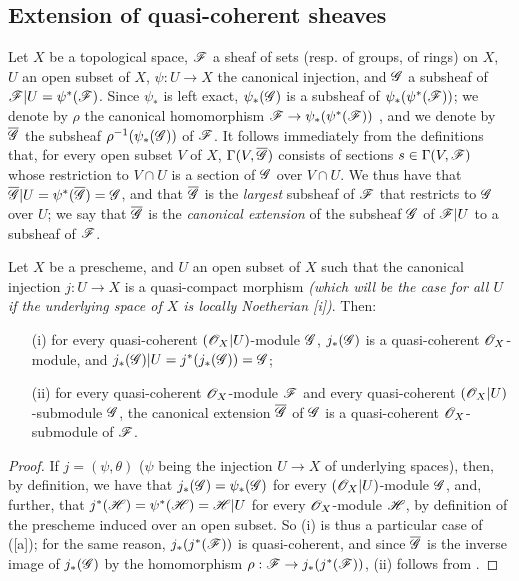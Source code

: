 \subsection{Extension of quasi-coherent sheaves}
\label{subsection:I.9.4}

\begin{env}[9.4.1]
\label{I.9.4.1}
Let
$X$ be a topological space, $\mathscr{F}$ a sheaf of sets (resp. of groups, of rings) on $X$, $U$
an open subset of $X$, $\psi:U\to X$ the canonical injection, and $\mathscr{G}$ a subsheaf of
$\mathscr{F}|U=\psi^*(\mathscr{F})$. Since $\psi_*$ is left exact, $\psi_*(\mathscr{G})$ is a subsheaf of
$\psi_*(\psi^*(\mathscr{F}))$; we denote by $\rho$ the canonical homomorphism
$\sh{F}\to\psi_*(\psi^*(\sh{F}))$ , and we denote by $\overline{\mathscr{G}}$
the subsheaf $\rho^{-1}(\psi_*(\mathscr{G}))$ of $\mathscr{F}$. It follows immediately from the
definitions that, for every open subset $V$ of $X$, $\Gamma(V,\overline{\mathscr{G}})$ consists of
sections $s\in\Gamma(V,\mathscr{F})$ whose restriction to $V\cap U$ is a section of $\mathscr{G}$ over
$V\cap U$. We thus have that $\overline{\mathscr{G}}|U=\psi^*(\overline{\mathscr{G}})=\mathscr{G}$, and that
$\overline{\mathscr{G}}$ is the \emph{largest} subsheaf of $\mathscr{F}$ that restricts to $\mathscr{G}$
over $U$; we say that $\overline{\mathscr{G}}$ is the \emph{canonical extension} of the subsheaf
$\mathscr{G}$ of $\mathscr{F}|U$ to a subsheaf of $\mathscr{F}$.
\end{env}

\begin{proposition}[9.4.2]
\label{I.9.4.2}
Let $X$ be a prescheme, and $U$ an open subset of $X$ such that the canonical injection
$j:U\to X$ is a quasi-compact morphism \emph{(which will be the case for \emph{all} $U$ if
the underlying space of $X$ is \emph{locally Noetherian}
[i])}. Then:
\begin{enumerate}
  \item[{\rm(i)}] for every quasi-coherent $(\mathscr{O}_X|U)$-module $\mathscr{G}$, $j_*(\mathscr{G})$
    is a quasi-coherent $\mathscr{O}_X$-module, and $j_*(\mathscr{G})|U=j^*(j_*(\mathscr{G}))=\mathscr{G}$;
  \item[{\rm(ii)}] for every quasi-coherent $\mathscr{O}_X$-module $\mathscr{F}$ and every quasi-coherent
    $(\mathscr{O}_X|U)$-submodule $\mathscr{G}$, the canonical extension
    $\overline{\mathscr{G}}$ of $\mathscr{G}$  is a
    quasi-coherent $\mathscr{O}_X$-submodule of $\mathscr{F}$.
\end{enumerate}
\end{proposition}

\begin{proof}
If $j=(\psi,\theta)$ ($\psi$ being the injection $U\to X$ of underlying spaces), then, by
definition, we have that $j_*(\mathscr{G})=\psi_*(\mathscr{G})$ for every $(\mathscr{O}_X|U)$-module $\mathscr{G}$,
and, further, that $j^*(\mathscr{H})=\psi^*(\mathscr{H})=\mathscr{H}|U$ for every $\mathscr{O}_X$-module $\mathscr{H}$,
by definition of the prescheme induced over an open subset. So (i) is thus a particular case
of ([a]); for the same reason, $j_*(j^*(\mathscr{F}))$ is quasi-coherent, and
since $\overline{\mathscr{G}}$ is the inverse image of $j_*(\mathscr{G})$ by the homomorphism
$\rho:\sh{F}\to j_*(j^*(\sh{F}))$, (ii) follows from .
\end{proof}

